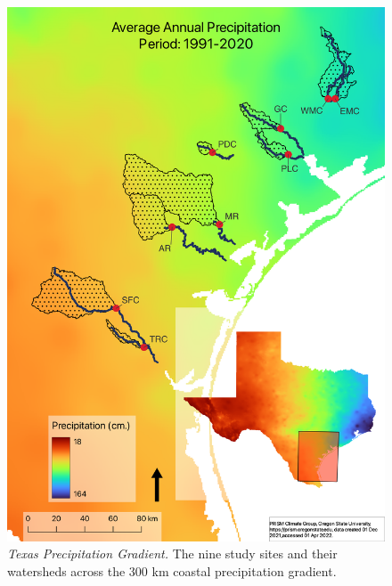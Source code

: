 \begin{figure}[htb]
\begin{center}
\includegraphics[scale = 0.7]{Figs/PPT.png}
\caption[Texas Precipitation Gradient]{\textit{Texas Precipitation Gradient.} The nine study sites and their watersheds across the 300 km coastal precipitation gradient.}
\label{Fig:PPT}
\end{center}
\end{figure}

